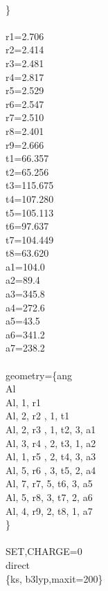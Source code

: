 \documentclass[letterpaper,10pt,english]{sphinxmanual}
\begin{document}
\begin{fulllineitems}
\begin{fulllineitems}
 \\\}
 \\
 \\r1=2.706
 \\r2=2.414
 \\r3=2.481
 \\r4=2.817
 \\r5=2.529
 \\r6=2.547
 \\r7=2.510
 \\r8=2.401
 \\r9=2.666
 \\t1=66.357
 \\t2=65.256
 \\t3=115.675
 \\t4=107.280
 \\t5=105.113
 \\t6=97.637
 \\t7=104.449
 \\t8=63.620
 \\a1=104.0
 \\a2=89.4
 \\a3=345.8
 \\a4=272.6
 \\a5=43.5
 \\a6=341.2
 \\a7=238.2
 \\
 \\geometry=\{ang
 \\Al
 \\Al,  1,     r1
 \\Al,  2,     r2 ,    1,      t1
 \\Al,  2,     r3 ,    1,     t2,       3,    a1
 \\Al,  3,     r4 ,    2,     t3,       1,     a2
 \\Al,  1,     r5 ,    2,     t4,       3,    a3
 \\Al,  5,     r6 ,    3,     t5,       2,    a4
 \\Al,  7,     r7,     5,      t6,      3,     a5
 \\Al,  5,     r8,     3,      t7,      2,    a6
 \\Al,  4,     r9,     2,      t8,      1,     a7
 \\\}
 \\
 \\SET,CHARGE=0
 \\direct
 \\\{ks, b3lyp,maxit=200\}
 \\
 \\\sphinxhyphen{}\sphinxhyphen{}\sphinxhyphen{}

\end{fulllineitems}
\end{fulllineitems}
\end{document}
